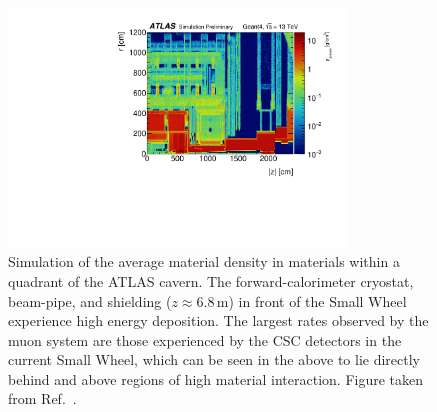 \begin{figure}[!htb]
    \begin{center}
        \includegraphics[width=0.8\textwidth]{figures/nsw/atlas_cavern_material_density_sim}
        \caption{
            Simulation of the average material density in materials within a quadrant of the ATLAS cavern.
            The forward-calorimeter cryostat, beam-pipe, and shielding ($z\approx 6.8$\,m)
            in front of the Small Wheel experience high energy deposition.
            The largest rates observed by the muon system are those experienced
            by the CSC detectors in the current Small Wheel, which can be seen in the above
            to lie directly behind and above regions of high material interaction.
            Figure taken from Ref.~\cite{ATL-PHYS-PUB-2016-017}.
        }
        \label{fig:cavern_bkg}
    \end{center}
\end{figure}

